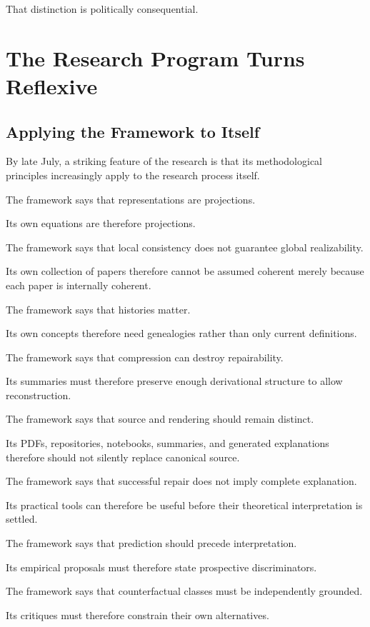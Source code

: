 \documentclass[11pt]{article}
\theoremstyle{remark}
\begin{document}
That distinction is politically consequential.

\section{The Research Program Turns Reflexive}

\subsection{Applying the Framework to Itself}

By late July, a striking feature of the research is that its methodological principles increasingly apply to the research process itself.

The framework says that representations are projections.

Its own equations are therefore projections.

The framework says that local consistency does not guarantee global realizability.

Its own collection of papers therefore cannot be assumed coherent merely because each paper is internally coherent.

The framework says that histories matter.

Its own concepts therefore need genealogies rather than only current definitions.

The framework says that compression can destroy repairability.

Its summaries must therefore preserve enough derivational structure to allow reconstruction.

The framework says that source and rendering should remain distinct.

Its PDFs, repositories, notebooks, summaries, and generated explanations therefore should not silently replace canonical source.

The framework says that successful repair does not imply complete explanation.

Its practical tools can therefore be useful before their theoretical interpretation is settled.

The framework says that prediction should precede interpretation.

Its empirical proposals must therefore state prospective discriminators.

The framework says that counterfactual classes must be independently grounded.

Its critiques must therefore constrain their own alternatives.
\end{document}

